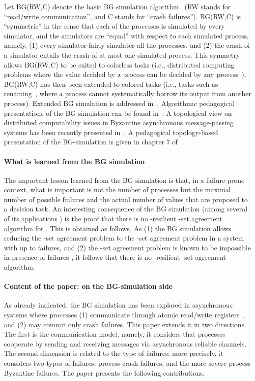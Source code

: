 \documentclass[11pt,letterpaper]{article}
\begin{document}
Let  BG(RW,C) denote the  basic BG simulation algorithm~\cite{BGLR01} (RW
stands for ``read/write communication'', and C stands for ``crash failures'').
BG(RW,C) is ``symmetric'' in  the sense that  each of the  
processes is  simulated by every simulator, and  the  simulators
are ``equal'' with respect  to each  simulated process, namely,
(1)  every simulator fairly  simulates all the processes,
and (2) the  crash  of  a simulator  entails the crash  of  at most  one
simulated process.  This symmetry allows  BG(RW,C) to be
suited to  colorless tasks (i.e., distributed computing problems where the
value decided by a process can be decided by any process~\cite{HR97}).
BG(RW,C) has then been extended to colored tasks
(i.e.,  tasks such as renaming~\cite{ABDPR90}, where a process cannot
systematically borrow its output from another process).
Extended BG simulation is addressed in~\cite{G09,IR09}.
Algorithmic pedagogical
presentations of the BG simulation can be found in~\cite{HRR13,IR09}.
A topological view on distributed computability issues in Byzantine
asynchronous message-passing systems has been  recently
presented in~\cite{HKR14,MTH14}.  A pedagogical topology-based 
presentation of the BG-simulation is given in chapter 7 of~\cite{HKR14}. 



\paragraph{What is learned from the BG simulation}
The  important  lesson  learned  from the BG simulation is  that, in a
failure-prone  context,  what is important  is  not the number of processes
but  the maximal  number of   possible failures  and the  actual  number of
values that are proposed to a  decision task.
An interesting  consequence  of  the  BG simulation  (among  several
of its  applications  \cite{BGLR01})  is  the  proof  that  there is no
-resilient -set agreement algorithm for  .
This is obtained as follows.  As (1)
the BG simulation allows reducing the -set agreement problem to the
-set agreement problem in  a system with up to   failures,
and (2) the -set agreement problem is known to be impossible
in presence of  failures \cite{BG93,HS99,SZ00}, it follows that there is
no   -resilient -set agreement algorithm. 


\paragraph{Content of the paper: on the BG-simulation side}
As already indicated, the BG simulation has been explored in asynchronous
systems where processes
(1) communicate through atomic read/write registers~\cite{L86}, and
(2) may commit  only  crash failures. This paper extends it in two directions.
The first is the communication model, namely, it considers
that processes cooperate by sending and receiving messages
via asynchronous reliable channels.
The second dimension is related to the type of failures; more precisely, it
considers two  types of failures: process crash failures, and
the more severe  process Byzantine failures.
The  paper presents the following contributions.
\end{document}
